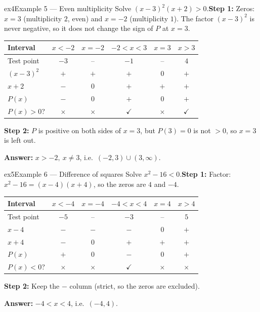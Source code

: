 \documentclass[11pt]{article}
\begin{document}
\begin{example}{ex4}{Example 5 --- Even multiplicity}
Solve $(x-3)^2(x+2)>0$.\soln \textbf{Step 1:} Zeros: $x=3$ (multiplicity $2$, even) and $x=-2$ (multiplicity $1$). The factor $(x-3)^2$ is never negative, so it does not change the sign of $P$ at $x=3$.\begin{center}\small\setlength{\tabcolsep}{4pt}\renewcommand{\arraystretch}{1.2}
\begin{tabular}{l|ccccc}
\hline
Interval & $x<-2$ & $x=-2$ & $-2<x<3$ & $x=3$ & $x>3$ \\ \hline
Test point & $-3$ & -- & $-1$ & -- & $4$ \\ \hline
$(x-3)^2$ & $+$ & $+$ & $+$ & $0$ & $+$ \\
$x+2$ & $-$ & $0$ & $+$ & $+$ & $+$ \\
\hline
$P(x)$ & $-$ & $0$ & $+$ & $0$ & $+$ \\ \hline
$P(x)>0$? & $\times$ & $\times$ & $\checkmark$ & $\times$ & $\checkmark$ \\ \hline
\end{tabular}\end{center}\textbf{Step 2:} $P$ is positive on both sides of $x=3$, but $P(3)=0$ is not $>0$, so $x=3$ is left out.

\textbf{Answer:} $x>-2,\ x\ne3$, i.e.\ $(-2,3)\cup(3,\infty)$.
\end{example}

\begin{example}{ex5}{Example 6 --- Difference of squares}
Solve $x^2-16<0$.\soln \textbf{Step 1:} Factor: $x^2-16=(x-4)(x+4)$, so the zeros are $4$ and $-4$.\begin{center}\small\setlength{\tabcolsep}{4pt}\renewcommand{\arraystretch}{1.2}
\begin{tabular}{l|ccccc}
\hline
Interval & $x<-4$ & $x=-4$ & $-4<x<4$ & $x=4$ & $x>4$ \\ \hline
Test point & $-5$ & -- & $-3$ & -- & $5$ \\ \hline
$x-4$ & $-$ & $-$ & $-$ & $0$ & $+$ \\
$x+4$ & $-$ & $0$ & $+$ & $+$ & $+$ \\
\hline
$P(x)$ & $+$ & $0$ & $-$ & $0$ & $+$ \\ \hline
$P(x)<0$? & $\times$ & $\times$ & $\checkmark$ & $\times$ & $\times$ \\ \hline
\end{tabular}\end{center}\textbf{Step 2:} Keep the $-$ column (strict, so the zeros are excluded).

\textbf{Answer:} $-4<x<4$, i.e.\ $(-4,4)$.
\end{example}
\end{document}
